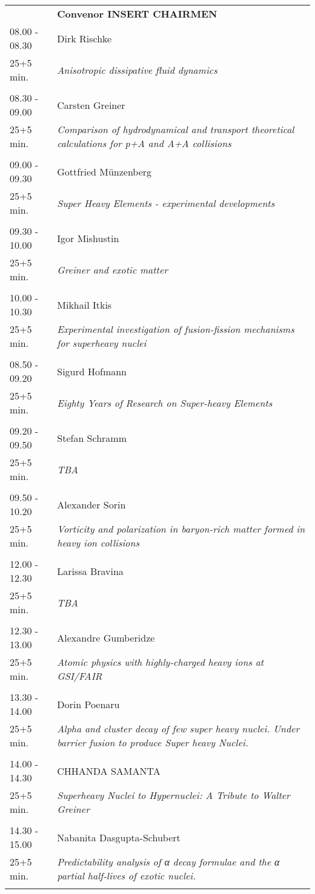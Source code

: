 \begin{longtable}{p{3cm}p{13cm}}
&\hfill {\bf Convenor INSERT CHAIRMEN }\\ 
08.00 - 08.30 & Dirk Rischke\\ 
25+5 min. & {\it Anisotropic dissipative fluid dynamics}\\ 
 & \\ 
08.30 - 09.00 & Carsten Greiner\\ 
25+5 min. & {\it Comparison of hydrodynamical and transport theoretical calculations for p+A and A+A collisions}\\ 
 & \\ 
09.00 - 09.30 & Gottfried Münzenberg\\ 
25+5 min. & {\it Super Heavy Elements -  experimental developments}\\ 
 & \\ 
09.30 - 10.00 & Igor Mishustin\\ 
25+5 min. & {\it Greiner and exotic matter}\\ 
 & \\ 
10.00 - 10.30 & Mikhail Itkis\\ 
25+5 min. & {\it Experimental investigation of fusion-fission mechanisms for superheavy nuclei}\\ 
 & \\ 
08.50 - 09.20 & Sigurd Hofmann\\ 
25+5 min. & {\it Eighty Years of Research on Super-heavy Elements}\\ 
 & \\ 
09.20 - 09.50 & Stefan Schramm\\ 
25+5 min. & {\it TBA}\\ 
 & \\ 
09.50 - 10.20 & Alexander Sorin\\ 
25+5 min. & {\it Vorticity and polarization in baryon-rich matter formed in heavy ion collisions}\\ 
 & \\ 
12.00 - 12.30 & Larissa Bravina\\ 
25+5 min. & {\it TBA}\\ 
 & \\ 
12.30 - 13.00 & Alexandre Gumberidze\\ 
25+5 min. & {\it Atomic physics with highly-charged heavy ions at GSI/FAIR}\\ 
 & \\ 
13.30 - 14.00 & Dorin  Poenaru\\ 
25+5 min. & {\it Alpha and cluster decay of few super heavy nuclei. Under barrier fusion to produce Super heavy Nuclei.}\\ 
 & \\ 
14.00 - 14.30 & CHHANDA SAMANTA\\ 
25+5 min. & {\it Superheavy Nuclei to Hypernuclei: A Tribute to Walter Greiner}\\ 
 & \\ 
14.30 - 15.00 & Nabanita Dasgupta-Schubert\\ 
25+5 min. & {\it Predictability analysis of α decay formulae and the α partial half-lives of exotic nuclei.}\\ 
 & \\ 
\end{longtable}


